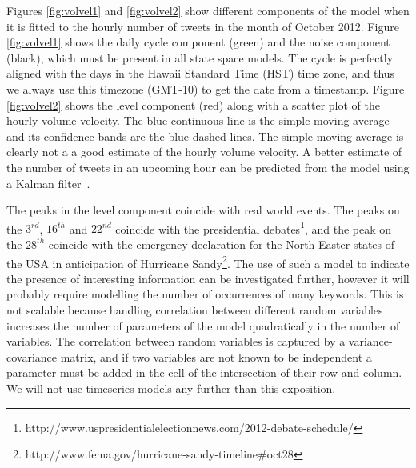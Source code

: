 \documentclass[letterpaper,12pt,titlepage,oneside,final]{book}
\begin{document}
Figures \ref{fig:volvel1} and \ref{fig:volvel2} show 
different components of the model 
when it is fitted to the hourly number of tweets
in the month of October 2012. 
Figure \ref{fig:volvel1}
shows the daily cycle component (green)
and the noise component (black), 
which must be present in all state space models.
The cycle is perfectly aligned with the days
in the Hawaii Standard Time (HST) time zone,
and thus we always use this timezone (GMT-10) 
to get the date from a timestamp.
Figure \ref{fig:volvel2} shows the level component (red) %
along with a scatter plot of the hourly volume velocity.
The blue continuous line is the simple moving average
and its confidence bands are the blue dashed lines.
The simple moving average is clearly not a
a good estimate of the hourly volume velocity.
A better estimate of the number of tweets in an upcoming hour 
can be predicted from the model 
using a Kalman filter~\cite{tusell2011kalman}.


The peaks in the level component
coincide with real world events.
The peaks on the $3^{rd}$, $16^{th}$ and $22^{nd}$  
coincide with
the presidential debates\footnote{http://www.uspresidentialelectionnews.com/2012-debate-schedule/}, and
the peak on the $28^{th}$ coincide with 
the emergency declaration for
the North Easter states of the USA
in anticipation of 
Hurricane Sandy\footnote{http://www.fema.gov/hurricane-sandy-timeline\#oct28}.
The use of such a model to indicate the presence
of interesting information can be investigated further,
however it will probably require modelling the number 
of occurrences of many keywords.
This is not scalable because 
handling correlation between different random variables
increases the number of parameters of the model quadratically in the number of variables.
The correlation between random variables is 
captured by a variance-covariance matrix,
and if two variables are not known to be independent
a parameter must be added in the cell of the intersection 
of their row and column. 
We will not use timeseries models
any further than this exposition.
\end{document}
